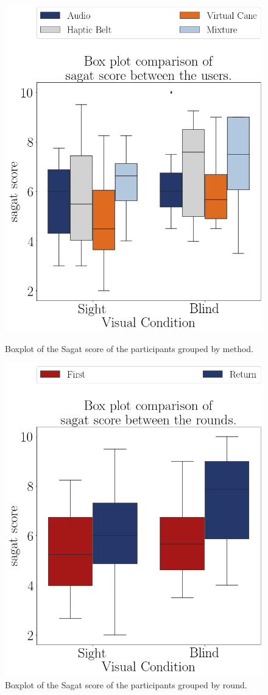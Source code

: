 \begin{figure}[!htb]
    \centering
    \begin{minipage}{0.45\textwidth}
        \centering
        \includegraphics[width = 0.8\linewidth]{Resultados/Sagat/Figuras/png/boxplot_sagat_4_scene.png}
        \caption{Boxplot of the Sagat score of the participants grouped by method.}
        \label{fig:boxplot_sagat_4_scene}
    \end{minipage}
    \begin{minipage}{0.45\textwidth}
        \centering
        \includegraphics[width = 0.8\linewidth]{Resultados/Sagat/Figuras/png/boxplot_sagat_4_rounds.png}
        \caption{Boxplot of the Sagat score of the participants grouped by round.}
        \label{fig:boxplot_sagat_4_rounds}
    \end{minipage}
\end{figure}


